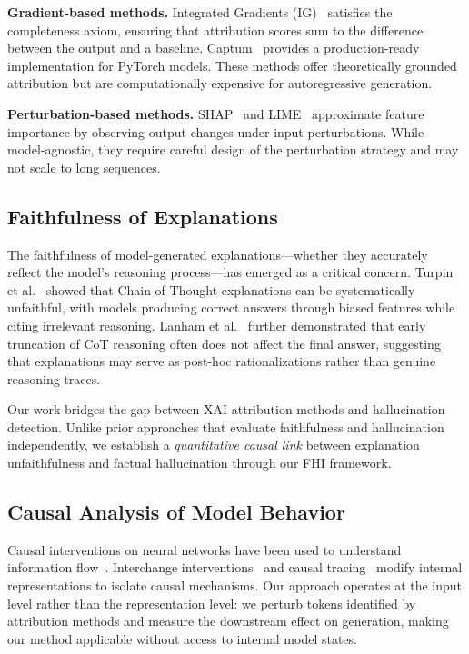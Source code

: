 \textbf{Gradient-based methods.} Integrated Gradients (IG)~\cite{sundararajan2017axiomatic} satisfies the completeness axiom, ensuring that attribution scores sum to the difference between the output and a baseline. Captum~\cite{kokhlikyan2020captum} provides a production-ready implementation for PyTorch models. These methods offer theoretically grounded attribution but are computationally expensive for autoregressive generation.

\textbf{Perturbation-based methods.} SHAP~\cite{lundberg2017unified} and LIME~\cite{ribeiro2016should} approximate feature importance by observing output changes under input perturbations. While model-agnostic, they require careful design of the perturbation strategy and may not scale to long sequences.

\subsection{Faithfulness of Explanations}

The faithfulness of model-generated explanations---whether they accurately reflect the model's reasoning process---has emerged as a critical concern. Turpin et al.~\cite{turpin2023language} showed that Chain-of-Thought explanations can be systematically unfaithful, with models producing correct answers through biased features while citing irrelevant reasoning. Lanham et al.~\cite{lanham2023measuring} further demonstrated that early truncation of CoT reasoning often does not affect the final answer, suggesting that explanations may serve as post-hoc rationalizations rather than genuine reasoning traces.

Our work bridges the gap between XAI attribution methods and hallucination detection. Unlike prior approaches that evaluate faithfulness and hallucination independently, we establish a \textit{quantitative causal link} between explanation unfaithfulness and factual hallucination through our FHI framework.

\subsection{Causal Analysis of Model Behavior}

Causal interventions on neural networks have been used to understand information flow~\cite{vig2020investigating, meng2022locating}. Interchange interventions~\cite{geiger2021causal} and causal tracing~\cite{meng2022locating} modify internal representations to isolate causal mechanisms. Our approach operates at the input level rather than the representation level: we perturb tokens identified by attribution methods and measure the downstream effect on generation, making our method applicable without access to internal model states.
